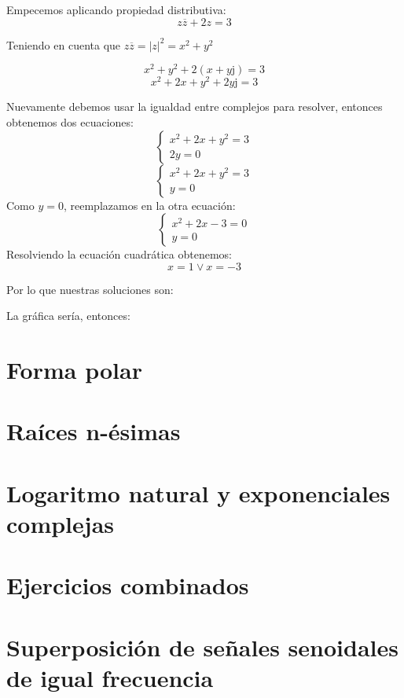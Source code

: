 \documentclass[11pt]{article}
\def\imj{\mathrm{j}}
\begin{document}
	Empecemos aplicando propiedad distributiva:
	$$z\overline{z}+2z=3$$
	\begin{center}
		Teniendo en cuenta que $z\overline{z}=\left\vert z \right\vert ^{2}=x^2+y^2$
	\end{center}
	$$x^2+y^2+2(x+y\imj)=3$$
	$$x^2+2x+y^2+2y\imj=3$$
	\begin{center}
		Nuevamente debemos usar la igualdad entre complejos para resolver, entonces obtenemos dos ecuaciones:
		$$\left\lbrace\begin{matrix}
		x^2+2x+y^2=3 \\
		2y=0
		\end{matrix}\right.$$
		$$\left\lbrace\begin{matrix}
		x^2+2x+y^2=3 \\
		y=0
		\end{matrix}\right.$$
		Como $y=0$, reemplazamos en la otra ecuación:
		$$\left\lbrace\begin{matrix}
		x^2+2x-3=0 \\
		y=0
		\end{matrix}\right.$$
		Resolviendo la ecuación cuadrática obtenemos:
		$$x=1\vee x=-3$$
	\end{center}
	Por lo que nuestras soluciones son:
	\begin{center}
	\end{center}
	La gráfica sería, entonces: \\
	\begin{center}
	\end{center}
	\section{Forma polar}
	\section{Raíces n-ésimas}
	\section{Logaritmo natural y exponenciales complejas}
	\section{Ejercicios combinados}
	\section{Superposición de señales senoidales de igual frecuencia}
\end{document}
